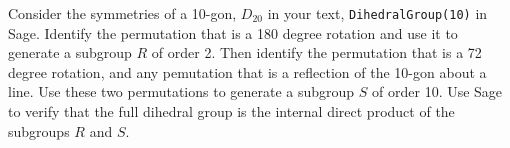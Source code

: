 \begin{sageverbatim}\end{sageverbatim}
%
%
Consider the symmetries of a 10-gon, $D_{20}$ in your text, \verb?DihedralGroup(10)? in Sage.  Identify the permutation that is a 180 degree rotation and use it to generate a subgroup $R$ of order 2.  Then identify the permutation that is a 72 degree rotation, and any pemutation that is a reflection of the 10-gon about a line.  Use these two permutations to generate a subgroup $S$ of order 10.  Use Sage to verify that the full dihedral group is the internal direct product of the subgroups $R$ and $S$.
\begin{sageverbatim}\end{sageverbatim}
%
